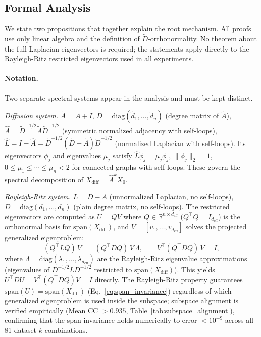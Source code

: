 \documentclass[11pt]{article}
\begin{document}
\subsection{Formal Analysis}

We state two propositions that together explain the root mechanism.
All proofs use only linear algebra and the definition of $\tilde{D}$-orthonormality.
No theorem about the full Laplacian eigenvectors is required; the statements
apply directly to the Rayleigh-Ritz restricted eigenvectors used in all experiments.

\paragraph{Notation.}
Two separate spectral systems appear in the analysis and must be kept distinct.

\textit{Diffusion system.}
$\tilde{A} = A + I$,
$\tilde{D} = \mathrm{diag}(\tilde{d}_1,\ldots,\tilde{d}_n)$ (degree matrix of
$\tilde{A}$), $\hat{A} = \tilde{D}^{-1/2}\tilde{A}\tilde{D}^{-1/2}$ (symmetric
normalized adjacency with self-loops),
$\hat{L} = I - \hat{A} = \tilde{D}^{-1/2}(\tilde{D}-\tilde{A})\tilde{D}^{-1/2}$
(normalized Laplacian with self-loops).
Its eigenvectors $\phi_j$ and eigenvalues $\mu_j$ satisfy
$\hat{L}\phi_j = \mu_j\phi_j$, $\|\phi_j\|_2 = 1$,
$0 \leq \mu_1 \leq \cdots \leq \mu_n < 2$ for connected graphs with self-loops.
These govern the spectral decomposition of $X_{\mathrm{diff}} = \hat{A}^k X_0$.

\textit{Rayleigh-Ritz system.}
$L = D - A$ (unnormalized Laplacian, no self-loops),
$D = \mathrm{diag}(d_1,\ldots,d_n)$ (plain degree matrix, no self-loops).
The restricted eigenvectors are computed as $U = QV$ where
$Q \in \mathbb{R}^{n\times d_{\mathrm{eff}}}$ ($Q^\top Q = I_{d_{\mathrm{eff}}}$)
is the orthonormal basis for $\mathrm{span}(X_{\mathrm{diff}})$, and
$V = [v_1,\ldots,v_{d_{\mathrm{eff}}}]$ solves the projected generalized eigenproblem:
\[
  (Q^\top L Q)\,V \;=\; (Q^\top D Q)\,V\,\Lambda,
  \qquad
  V^\top (Q^\top D Q)\,V = I,
\]
where $\Lambda = \mathrm{diag}(\lambda_1,\ldots,\lambda_{d_{\mathrm{eff}}})$
are the Rayleigh-Ritz eigenvalue approximations (eigenvalues of
$D^{-1/2}LD^{-1/2}$ restricted to $\mathrm{span}(X_{\mathrm{diff}})$).
This yields $U^\top D U = V^\top(Q^\top D Q)V = I$ directly.
The Rayleigh-Ritz property guarantees $\mathrm{span}(U) = \mathrm{span}(X_{\mathrm{diff}})$
(Eq.~\ref{eq:span_invariance}) regardless of which generalized eigenproblem is used
inside the subspace; subspace alignment is verified empirically (Mean CC $> 0.935$,
Table~\ref{tab:subspace_alignment}), confirming that the span invariance holds
numerically to error $< 10^{-9}$ across all 81 dataset-$k$ combinations.
\end{document}
